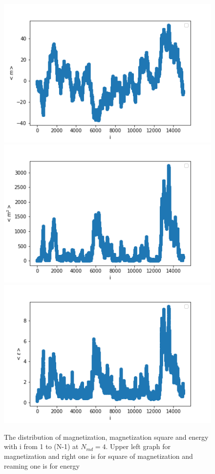 \documentclass[11pt, a4paper, DIV=12]{scrartcl}
\begin{document}
\begin{figure}[H]
	\centering
	\includegraphics[width=0.6\linewidth]{magnitization.png}\includegraphics[width=0.6\linewidth]{magnitization_square.png}
	\includegraphics[width=0.8\linewidth]{energy.png}
	\caption{The distribution of magnetization, magnetization square and energy with i from 1 to (N-1) at $ N_{md}=4 $. Upper left graph for magnetization and right one is for square of magnetization and reaming one is for energy}
	\label{fig:magnitization}
\end{figure}
\end{document}

